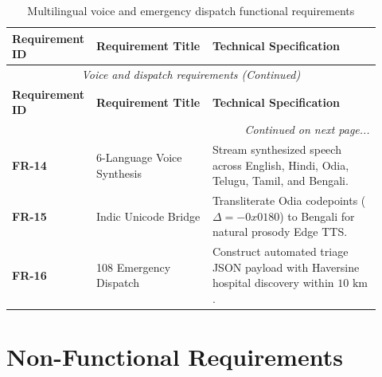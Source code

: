 \small
\begin{longtable}{@{}p{0.16\linewidth} p{0.31\linewidth} p{0.45\linewidth}@{}}
\caption{Multilingual voice and emergency dispatch functional requirements}\label{tab:3_5_voice_reqs} \\
\toprule
\textbf{Requirement ID} & \textbf{Requirement Title} & \textbf{Technical Specification} \\
\midrule
\endfirsthead
\toprule
\multicolumn{3}{c}{\small\textit{Voice and dispatch requirements (Continued)}} \\[4pt]
\midrule
\textbf{Requirement ID} & \textbf{Requirement Title} & \textbf{Technical Specification} \\
\midrule
\endhead
\midrule
\multicolumn{3}{r}{\footnotesize\textit{Continued on next page...}} \\
\bottomrule
\endfoot
\bottomrule
\endlastfoot
\textbf{FR-14} & 6-Language Voice Synthesis & Stream synthesized speech across English, Hindi, Odia, Telugu, Tamil, and Bengali. \\
\midrule
\textbf{FR-15} & Indic Unicode Bridge & Transliterate Odia codepoints ($\Delta = -0x0180$) to Bengali for natural prosody Edge TTS. \\
\midrule
\textbf{FR-16} & 108 Emergency Dispatch & Construct automated triage JSON payload with Haversine hospital discovery within $10\text{ km}$. \\
\bottomrule
\end{longtable}
\normalsize


\section{Non-Functional Requirements}
\label{sec:sys_non_functional_reqs}

